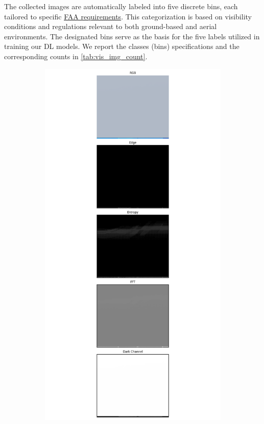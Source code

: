 The collected images are automatically labeled into five discrete bins, each tailored to specific \href{https://www.faa.gov/air_traffic/publications/atpubs/aim_html/}{FAA requirements}. This categorization is based on visibility conditions and regulations relevant to both ground-based and aerial environments. The designated bins serve as the basis for the five labels utilized in training our DL models. 
We report the classes (bins) specifications and the corresponding counts in \cref{tab:vis_img_count}.


\begin{figure}
  \centering
  \begin{subfigure}[b]{0.15\textwidth}
    \includegraphics[width=\textwidth, trim={7.5cm 0cm 7.5cm 0cm},clip]{imgs/examples/exp_0_featuresMiles_0.12427454732996136_featuresM_200_features.png}

\end{subfigure}
\end{figure}
